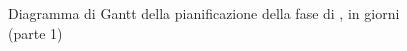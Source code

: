 	
\pagebreak
\begin{figure}[H]
\label{img:genweeks1}
\caption{Diagramma di Gantt della pianificazione della fase di \AR, in giorni (parte 1)}
\end{figure}

